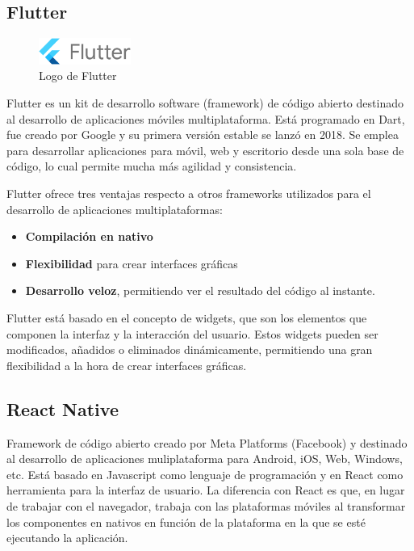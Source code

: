 \subsection{Flutter}
\begin{figure}
\vspace*{-0.4cm}
\centering
\includegraphics[width=0.27\textwidth]{imagenes/c2/flutter.png}

\caption{Logo de Flutter}
\end{figure}Flutter es un kit de desarrollo software (framework) de código abierto destinado al desarrollo de aplicaciones móviles multiplataforma. Está programado en Dart, fue creado por Google y su primera versión estable se lanzó en 2018.
Se emplea para desarrollar aplicaciones para móvil, web y escritorio desde una sola base de código, lo cual permite mucha más agilidad y consistencia.

Flutter ofrece tres ventajas respecto a otros frameworks utilizados para el desarrollo de aplicaciones multiplataformas:

\begin{itemize}
\item \textbf{Compilación en nativo}
\item \textbf{Flexibilidad} para crear interfaces gráficas
\item \textbf{Desarrollo veloz}, permitiendo ver el resultado del código al instante.

\end{itemize}
Flutter está basado en el concepto de widgets, que son los elementos que componen la interfaz y la interacción del usuario. Estos widgets pueden ser modificados, añadidos o eliminados
dinámicamente, permitiendo una gran flexibilidad a la hora de crear interfaces gráficas. 

\subsection{React Native}
Framework de código abierto creado por Meta Platforms (Facebook) y destinado al desarrollo de aplicaciones muliplataforma para Android, iOS, Web, Windows, etc.
Está basado en Javascript como lenguaje de programación y en React como herramienta para la interfaz de usuario. La diferencia con React es que, en lugar de 
trabajar con el navegador, trabaja con las plataformas móviles al transformar los componentes en nativos en función de la plataforma en la que se esté
ejecutando la aplicación. 

